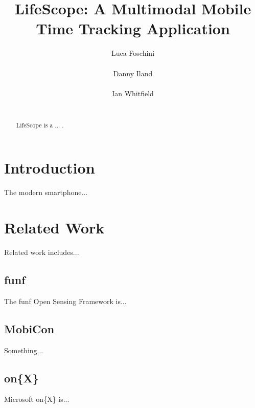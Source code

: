\documentclass{acm_proc_article-sp}
\begin{document}
\title{LifeScope: A Multimodal Mobile Time Tracking Application}

\author{
\alignauthor
Luca Foschini\\
       \\
\alignauthor
Danny Iland\\
       \\
\alignauthor 
Ian Whitfield\\
       \\
}


\maketitle
\begin{abstract}
LifeScope is a ...
\cite{Lamport:LaTeX}.
\end{abstract}


\section{Introduction}
The modern smartphone...


\section{Related Work}
Related work includes... 
\subsection {funf}
The funf Open Sensing Framework is...
\subsection {MobiCon}
Something...
\subsection {on\{X\}}
Microsoft on\{X\} is...
\end{document}
